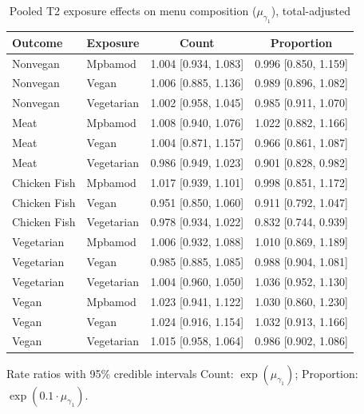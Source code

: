 \begin{table}[H]
\centering
\caption{Pooled T2 exposure effects on menu composition ($\mu_{\gamma_1}$), total-adjusted}
\label{tab:a1_t2_mu_gamma_adj}
\begin{tabular}{llcc}
\toprule
Outcome & Exposure & Count & Proportion \\
\midrule
Nonvegan & Mpbamod & 1.004 [0.934, 1.083] & 0.996 [0.850, 1.159] \\
Nonvegan & Vegan & 1.006 [0.885, 1.136] & 0.989 [0.896, 1.082] \\
Nonvegan & Vegetarian & 1.002 [0.958, 1.045] & 0.985 [0.911, 1.070] \\
Meat & Mpbamod & 1.008 [0.940, 1.076] & 1.022 [0.882, 1.166] \\
Meat & Vegan & 1.004 [0.871, 1.157] & 0.966 [0.861, 1.087] \\
Meat & Vegetarian & 0.986 [0.949, 1.023] & 0.901 [0.828, 0.982] \\
Chicken Fish & Mpbamod & 1.017 [0.939, 1.101] & 0.998 [0.851, 1.172] \\
Chicken Fish & Vegan & 0.951 [0.850, 1.060] & 0.911 [0.792, 1.047] \\
Chicken Fish & Vegetarian & 0.978 [0.934, 1.022] & 0.832 [0.744, 0.939] \\
Vegetarian & Mpbamod & 1.006 [0.932, 1.088] & 1.010 [0.869, 1.189] \\
Vegetarian & Vegan & 0.985 [0.885, 1.085] & 0.988 [0.904, 1.081] \\
Vegetarian & Vegetarian & 1.004 [0.960, 1.050] & 1.036 [0.952, 1.130] \\
Vegan & Mpbamod & 1.023 [0.941, 1.122] & 1.030 [0.860, 1.230] \\
Vegan & Vegan & 1.024 [0.916, 1.154] & 1.032 [0.913, 1.166] \\
Vegan & Vegetarian & 1.015 [0.958, 1.064] & 0.986 [0.902, 1.086] \\
\bottomrule
\end{tabular}
\par\smallskip\footnotesize Rate ratios with 95\% credible intervals Count: $\exp(\mu_{\gamma_1})$; Proportion: $\exp(0.1 \cdot \mu_{\gamma_1})$.
\end{table}
